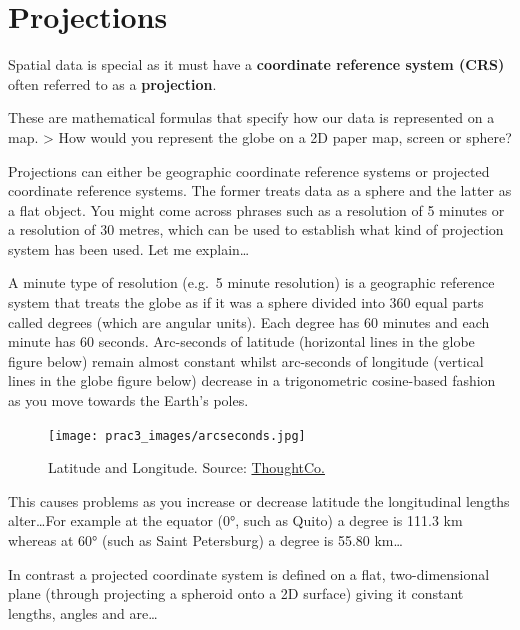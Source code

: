 \documentclass[
  letterpaper,
]{scrbook}
\begin{document}
\hypertarget{projections}{%
\section{Projections}\label{projections}}

Spatial data is special as it must have a \textbf{coordinate reference
system (CRS)} often referred to as a \textbf{projection}.

These are mathematical formulas that specify how our data is represented
on a map. \textgreater{} How would you represent the globe on a 2D paper
map, screen or sphere?

Projections can either be geographic coordinate reference systems or
projected coordinate reference systems. The former treats data as a
sphere and the latter as a flat object. You might come across phrases
such as a resolution of 5 minutes or a resolution of 30 metres, which
can be used to establish what kind of projection system has been used.
Let me explain\ldots{}

A minute type of resolution (e.g.~5 minute resolution) is a geographic
reference system that treats the globe as if it was a sphere divided
into 360 equal parts called degrees (which are angular units). Each
degree has 60 minutes and each minute has 60 seconds. Arc-seconds of
latitude (horizontal lines in the globe figure below) remain almost
constant whilst arc-seconds of longitude (vertical lines in the globe
figure below) decrease in a trigonometric cosine-based fashion as you
move towards the Earth's poles.

\begin{figure}

{\centering \texttt{[image: prac3\_images/arcseconds.jpg]}

}

\caption{Latitude and Longitude. Source:
\href{https://www.thoughtco.com/degree-of-latitude-and-longitude-distance-4070616}{ThoughtCo.}}

\end{figure}

This causes problems as you increase or decrease latitude the
longitudinal lengths alter\ldots For example at the equator (0°, such as
Quito) a degree is 111.3 km whereas at 60° (such as Saint Petersburg) a
degree is 55.80 km\ldots{}

In contrast a projected coordinate system is defined on a flat,
two-dimensional plane (through projecting a spheroid onto a 2D surface)
giving it constant lengths, angles and are\ldots{}
\end{document}
